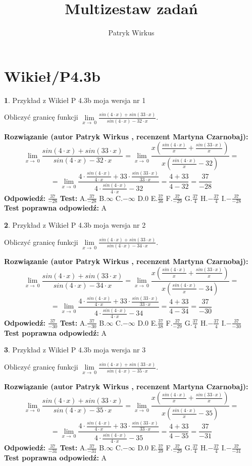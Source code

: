 \documentclass[12pt, a4paper]{article}
\title{Multizestaw zadań}
\author{Patryk Wirkus}
\date{}
\theoremstyle{definition} %
\newtheorem{zad}{}
\newcommand{\kategoria}[1]{\section{#1}}
\newcommand{\zadStart}[1]{\begin{zad}#1\newline}
\newcommand{\zadStop}{\end{zad}}
\newcommand{\rozwStart}[2]{\noindent \textbf{Rozwiązanie (autor #1 , recenzent #2): }\newline}
\newcommand{\rozwStop}{\newline}
\newcommand{\odpStart}{\noindent \textbf{Odpowiedź:}\newline}
\newcommand{\odpStop}{\newline}
\newcommand{\testStart}{\noindent \textbf{Test:}\newline}
\newcommand{\testStop}{\newline}
\newcommand{\kluczStart}{\noindent \textbf{Test poprawna odpowiedź:}\newline}
\newcommand{\kluczStop}{\newline}
\begin{document}
\maketitle

\kategoria{Wikieł/P4.3b}


\zadStart{Przykład z Wikieł P 4.3b moja wersja nr 1}


Obliczyć granicę funkcji $\lim\limits_{x\to\ 0}\frac{sin(4 \cdot x)+sin(33 \cdot x)}{sin(4 \cdot x)-32 \cdot x}$.
\zadStop
\rozwStart{Patryk Wirkus}{Martyna Czarnobaj}
$$\lim\limits_{x\to\ 0}\frac{sin(4 \cdot x)+sin(33 \cdot x)}{sin(4 \cdot x)-32 \cdot x}=\lim\limits_{x\to\ 0}\frac{x(\frac{sin(4 \cdot x)}{x}+\frac{sin(33 \cdot x)}{x})}{x(\frac{sin(4 \cdot x)}{x}-32)}=$$
$$=\lim\limits_{x\to\ 0}\frac{4 \cdot \frac{sin(4 \cdot x)}{4 \cdot x}+33 \cdot \frac{sin(33 \cdot x)}{33 \cdot x}}{4 \cdot \frac{sin(4 \cdot x)}{4 \cdot x}-32}=\frac{4+33}{4-32} = \frac{37}{-28}$$
\rozwStop
\odpStart
$\frac{37}{-28}$
\odpStop
\testStart
A.$\frac{37}{-28}$
B.$\infty$
C.$-\infty$
D.$0$
E.$\frac{37}{36}$
F.$\frac{37}{-29}$
G.$\frac{37}{4}$
H.$-\frac{37}{4}$
I.$-\frac{37}{-28}$
\testStop
\kluczStart
A
\kluczStop



\zadStart{Przykład z Wikieł P 4.3b moja wersja nr 2}


Obliczyć granicę funkcji $\lim\limits_{x\to\ 0}\frac{sin(4 \cdot x)+sin(33 \cdot x)}{sin(4 \cdot x)-34 \cdot x}$.
\zadStop
\rozwStart{Patryk Wirkus}{Martyna Czarnobaj}
$$\lim\limits_{x\to\ 0}\frac{sin(4 \cdot x)+sin(33 \cdot x)}{sin(4 \cdot x)-34 \cdot x}=\lim\limits_{x\to\ 0}\frac{x(\frac{sin(4 \cdot x)}{x}+\frac{sin(33 \cdot x)}{x})}{x(\frac{sin(4 \cdot x)}{x}-34)}=$$
$$=\lim\limits_{x\to\ 0}\frac{4 \cdot \frac{sin(4 \cdot x)}{4 \cdot x}+33 \cdot \frac{sin(33 \cdot x)}{33 \cdot x}}{4 \cdot \frac{sin(4 \cdot x)}{4 \cdot x}-34}=\frac{4+33}{4-34} = \frac{37}{-30}$$
\rozwStop
\odpStart
$\frac{37}{-30}$
\odpStop
\testStart
A.$\frac{37}{-30}$
B.$\infty$
C.$-\infty$
D.$0$
E.$\frac{37}{38}$
F.$\frac{37}{-29}$
G.$\frac{37}{4}$
H.$-\frac{37}{4}$
I.$-\frac{37}{-30}$
\testStop
\kluczStart
A
\kluczStop



\zadStart{Przykład z Wikieł P 4.3b moja wersja nr 3}


Obliczyć granicę funkcji $\lim\limits_{x\to\ 0}\frac{sin(4 \cdot x)+sin(33 \cdot x)}{sin(4 \cdot x)-35 \cdot x}$.
\zadStop
\rozwStart{Patryk Wirkus}{Martyna Czarnobaj}
$$\lim\limits_{x\to\ 0}\frac{sin(4 \cdot x)+sin(33 \cdot x)}{sin(4 \cdot x)-35 \cdot x}=\lim\limits_{x\to\ 0}\frac{x(\frac{sin(4 \cdot x)}{x}+\frac{sin(33 \cdot x)}{x})}{x(\frac{sin(4 \cdot x)}{x}-35)}=$$
$$=\lim\limits_{x\to\ 0}\frac{4 \cdot \frac{sin(4 \cdot x)}{4 \cdot x}+33 \cdot \frac{sin(33 \cdot x)}{33 \cdot x}}{4 \cdot \frac{sin(4 \cdot x)}{4 \cdot x}-35}=\frac{4+33}{4-35} = \frac{37}{-31}$$
\rozwStop
\odpStart
$\frac{37}{-31}$
\odpStop
\testStart
A.$\frac{37}{-31}$
B.$\infty$
C.$-\infty$
D.$0$
E.$\frac{37}{39}$
F.$\frac{37}{-29}$
G.$\frac{37}{4}$
H.$-\frac{37}{4}$
I.$-\frac{37}{-31}$
\testStop
\kluczStart
A
\kluczStop
\end{document}
